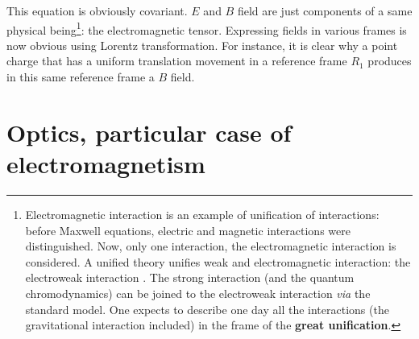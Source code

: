 \documentclass[12pt]{book}
\begin{document}
This equation is obviously covariant. $E$ and $B$ field are just components of
a same physical being\footnote{Electromagnetic interaction is an
example of unification of interactions: before Maxwell equations,
electric and magnetic interactions were distinguished. Now, only one
interaction, the electromagnetic interaction is considered. A unified
theory unifies weak and electromagnetic interaction: the electroweak
interaction \cite{ph:parti:Kane93}. The strong interaction (and the quantum
chromodynamics) can be joined to the electroweak interaction {\it via}
the standard model. One expects to describe one day all the
interactions (the gravitational interaction included) in the frame of
the {\bf great unification}. 
}: the electromagnetic tensor. Expressing fields in
various frames is now obvious using Lorentz transformation. For instance, it
is clear why a point charge that has a uniform translation movement in a
reference frame $R_1$ produces in this same reference frame a $B$ field.

\section{Optics, particular case of electromagnetism}
\end{document}
